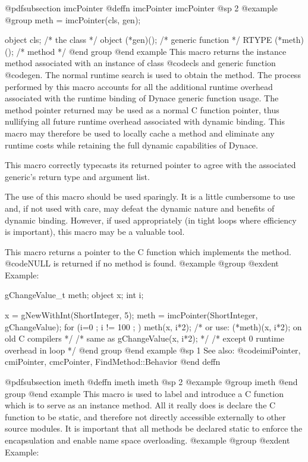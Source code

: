 {{{{@pdfsubsection {imcPointer}
@deffn {imcPointer} imcPointer
@sp 2
@example
@group
meth = imcPointer(cls, gen);

object  cls;            /*  the class           */
object  (*gen)();       /*  generic function    */
RTYPE   (*meth)();      /*  method              */
@end group
@end example
This macro returns the instance method associated with an instance of
class @code{cls} and generic function @code{gen}.  The normal runtime
search is used to obtain the method.  The process performed by this
macro accounts for all the additional runtime overhead associated with
the runtime binding of Dynace generic function usage.  The method pointer
returned may be used as a normal C function pointer, thus nullifying all
future runtime overhead associated with dynamic binding.  This macro may
therefore be used to locally cache a method and eliminate any runtime
costs while retaining the full dynamic capabilities of Dynace. 

This macro correctly typecasts its returned pointer to agree with
the associated generic's return type and argument list.

The use of this macro should be used sparingly.  It is a little
cumbersome to use and, if not used with care, may defeat the dynamic
nature and benefits of dynamic binding.  However, if used appropriately
(in tight loops where efficiency is important), this macro may be
a valuable tool.

This macro returns a pointer to the C function which implements the method.
@code{NULL} is returned if no method is found.
@example
@group
@exdent Example:

gChangeValue_t  meth;
object  x;
int     i;

x = gNewWithInt(ShortInteger, 5);
meth = imcPointer(ShortInteger, gChangeValue);
for (i=0 ; i != 100 ; )
        meth(x, i*2);
/* or use:  (*meth)(x, i*2);  on old C compilers */
/* same as gChangeValue(x, i*2);  */
/* except 0 runtime overhead in loop          */
@end group
@end example
@sp 1
See also:  @code{imiPointer, cmiPointer, cmcPointer, FindMethod::Behavior}
@end deffn

















@pdfsubsection {imeth}
@deffn {imeth} imeth
@sp 2
@example
@group
imeth
@end group
@end example
This macro is used to label and introduce a C function which is to serve
as an instance method.  All it really does is declare the C function to be
static, and therefore not directly accessible externally to other source
modules.  It is important that all methods be declared static to enforce
the encapsulation and enable name space overloading.
@example
@group
@exdent Example:

}}}}
